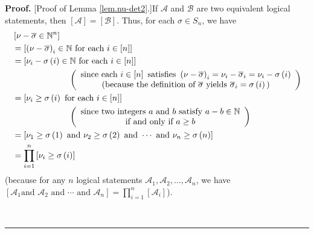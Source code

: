 \documentclass[numbers=enddot,12pt,final,onecolumn,notitlepage,english]{scrartcl}%
\theoremstyle{definition}
\newenvironment{proof}[1][Proof]{\noindent\textbf{#1.} }{\ \rule{0.5em}{0.5em}}
\let\prodnonlimits\prod
\renewcommand{\prod}{\prodnonlimits\limits}
\newenvironment{vershort}{}{}
\begin{document}
\begin{vershort}
\begin{proof}
[Proof of Lemma \ref{lem.nu-det2}.]If $\mathcal{A}$ and $\mathcal{B}$ are two
equivalent logical statements, then $\left[  \mathcal{A}\right]  =\left[
\mathcal{B}\right]  $. Thus, for each $\sigma\in S_{n}$, we have%
\begin{align}
&  \left[  \nu-\overline{\sigma}\in\mathbb{N}^{n}\right] \nonumber\\
&  =\left[  \left(  \nu-\overline{\sigma}\right)  _{i}\in\mathbb{N}\text{ for
each }i\in\left[  n\right]  \right] \nonumber\\
&  =\left[  \nu_{i}-\sigma\left(  i\right)  \in\mathbb{N}\text{ for each }%
i\in\left[  n\right]  \right] \nonumber\\
&  \ \ \ \ \ \ \ \ \ \ \ \ \ \ \ \ \ \ \ \ \left(
\begin{array}
[c]{c}%
\text{since each }i\in\left[  n\right]  \text{ satisfies }\left(
\nu-\overline{\sigma}\right)  _{i}=\nu_{i}-\overline{\sigma}_{i}=\nu
_{i}-\sigma\left(  i\right) \\
\text{(because the definition of }\overline{\sigma}\text{ yields }%
\overline{\sigma}_{i}=\sigma\left(  i\right)  \text{)}%
\end{array}
\right) \nonumber\\
&  =\left[  \nu_{i}\geq\sigma\left(  i\right)  \text{ for each }i\in\left[
n\right]  \right] \nonumber\\
&  \ \ \ \ \ \ \ \ \ \ \ \ \ \ \ \ \ \ \ \ \left(
\begin{array}
[c]{c}%
\text{since two integers }a\text{ and }b\text{ satisfy }a-b\in\mathbb{N}\\
\text{if and only if }a\geq b
\end{array}
\right) \nonumber\\
&  =\left[  \nu_{1}\geq\sigma\left(  1\right)  \text{ and }\nu_{2}\geq
\sigma\left(  2\right)  \text{ and }\cdots\text{ and }\nu_{n}\geq\sigma\left(
n\right)  \right] \nonumber\\
&  =\prod_{i=1}^{n}\left[  \nu_{i}\geq\sigma\left(  i\right)  \right]
\label{pf.lem.nu-det2.short.ive}%
\end{align}
(because for any $n$ logical statements $\mathcal{A}_{1},\mathcal{A}%
_{2},\ldots,\mathcal{A}_{n}$, we have \newline$\left[  \mathcal{A}_{1}\text{
and }\mathcal{A}_{2}\text{ and }\cdots\text{ and }\mathcal{A}_{n}\right]
=\prod_{i=1}^{n}\left[  \mathcal{A}_{i}\right]  $).


\end{proof}
\end{vershort}
\end{document}
